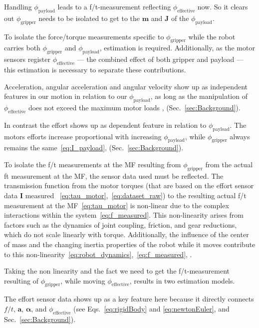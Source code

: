     Handling \(\phi_{\text{payload}}\) leads to a f/t-measurement reflecting \(\phi_{\text{effective}}\) now. So it clears out \(\phi_{\text{gripper}}\) needs to be isolated to get to the $\boldsymbol{m}$ and $\boldsymbol{J}$ of the \(\phi_{\text{payload}}\).
    
    To isolate the force/torque measurements specific to \(\phi_{\text{gripper}}\) while the robot carries both \(\phi_{\text{gripper}}\) and \(\phi_{\text{payload}}\), estimation is required. Additionally, as the motor sensors register \(\phi_{\text{effective}}\) — the combined effect of both gripper and payload — this estimation is necessary to separate these contributions.
    
    Acceleration, angular acceleration and angular velocity show up as independent features in our motion in relation to our \(\phi_{\text{payload}}\), as long as the manipulation of \(\phi_{\text{effective}}\) does not exceed the maximum motor loads \cite{urrea2018parameter}, (Sec.~\ref{sec:Background}).
    
    In contrast the effort shows up as dependent feature in relation to \(\phi_{\text{payload}}\). The motors efforts increase proportional with increasing \(\phi_{\text{payload}}\), while \(\phi_{\text{gripper}}\) always remains the same~\eqref{eq:I_payload}, (Sec.~\ref{sec:Background}).
    
    To isolate the f/t measurements at the MF resulting from \(\phi_{\text{gripper}}\) from the actual ft measurement at the MF, the sensor data used must be reflected. The transmission function from the motor torques (that are based on the effort sensor data \(\boldsymbol{I}\) measured ~\eqref{eq:tau_motor},~\eqref{eq:dataset_raw}) to the resulting actual f/t measurement at the MF~\eqref{eq:tau_motor} is non-linear due to the complex interactions within the system~\eqref{eq:f_measured}. This non-linearity arises from factors such as the dynamics of joint coupling, friction, and gear reductions, which do not scale linearly with torque. Additionally, the influence of the center of mass and the changing inertia properties of the robot while it moves contribute to this non-linearity~\eqref{eq:robot_dynamics},~\eqref{eq:f_measured}, \cite{liu2019end, blumberg2023estimation}.
    
    Taking the non linearity and the fact we need to get the f/t-measurement resulting of \(\phi_{\text{gripper}}\), while moving \(\phi_{\text{effective}}\), results in two estimation models. 
    
    The effort sensor data shows up as a key feature here because it directly connects $f/t$, $\boldsymbol{a}$, $\boldsymbol{\alpha}$, and $\phi_{\text{effective}}$ (see Eqs.~\eqref{eq:rigidBody} and \eqref{eq:newtonEuler}, and Sec.~\ref{sec:Background}).

